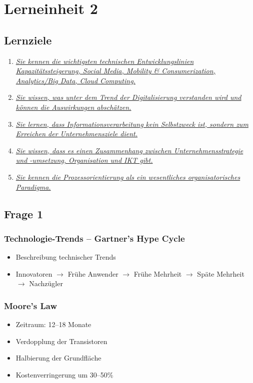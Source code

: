 \documentclass[a4paper]{article}
\begin{document}
			\pagebreak
			
			\section{Lerneinheit 2}
			\subsection{Lernziele}
			\begin{enumerate}
				\item \hyperref[le2-1]{\textit{Sie kennen die wichtigsten technischen Entwicklungslinien Kapazitätssteigerung, Social Media, Mobility \& Consumerization, Analytics/Big Data, Cloud Computing.}}
				\item \hyperref[le2-2]{\textit{Sie wissen, was unter dem Trend der Digitalisierung verstanden wird und können die Auswirkungen abschätzen.}}
				\item \hyperref[le2-3]{\textit{Sie lernen, dass Informationsverarbeitung kein Selbstzweck ist, sondern zum Erreichen der Unternehmensziele dient.}}
				\item \hyperref[le2-4]{\textit{Sie wissen, dass es einen Zusammenhang zwischen Unternehmensstrategie und -umsetzung, Organisation und IKT gibt.}}
				\item \hyperref[le2-5]{\textit{Sie kennen die Prozessorientierung als ein wesentliches organisatorisches Paradigma.}}
			\end{enumerate}
			
			\subsection{Frage 1}
			\label{le2-1}
			\subsubsection{Technologie-Trends -- Gartner's Hype Cycle}
			\begin{itemize}
				\item Beschreibung technischer Trends
				\item Innovatoren $\rightarrow$ Frühe Anwender $\rightarrow$ Frühe Mehrheit $\rightarrow$ Späte Mehrheit $\rightarrow$ Nachzügler
			\end{itemize}
			\hrulefill
			\subsubsection{Moore's Law}
			\begin{itemize}
				\item Zeitraum: 12--18 Monate
				\item Verdopplung der Transistoren
				\item Halbierung der Grundfläche
				\item Kostenverringerung um 30--50\%
			\end{itemize}
			\hrulefill
\end{document}
